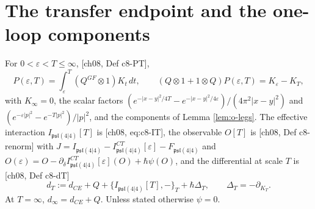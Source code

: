 \section{The transfer endpoint and the one-loop components}

\begin{definition}
\label{def:o-scale}
For $0<\varepsilon<T\le\infty$, [ch08, Def c8-PT],
\begin{equation}
P(\varepsilon,T)=\int_\varepsilon^T(Q^{GF}\otimes1)K_t\,dt,\qquad (Q\otimes1+1\otimes Q)P(\varepsilon,T)=K_\varepsilon-K_T,
\label{eq:o-PT}
\end{equation}
with $K_\infty=0$, the scalar factors $(e^{-|x-y|^2/4T}-e^{-|x-y|^2/4\varepsilon})/(4\pi^2|x-y|^2)$ and $(e^{-\varepsilon|p|^2}-e^{-T|p|^2})/|p|^2$, and the components of Lemma \ref{lem:o-legs}. The effective interaction $I_{\mathfrak{psl}(4|4)}[T]$ is [ch08, eq:c8-IT], the observable $O[T]$ is [ch08, Def c8-renorm] with $J=I_{\mathfrak{psl}(4|4)}-I^{CT}_{\mathfrak{psl}(4|4)}[\varepsilon]-F_{\mathfrak{psl}(4|4)}$ and $O(\varepsilon)=O-\partial_\delta I^{CT}_{\mathfrak{psl}(4|4)}[\varepsilon](O)+\hbar\psi(O)$, and the differential at scale $T$ is [ch08, Def c8-dT]
\begin{equation}
d_T:=d_{CE}+Q+\big\{I_{\mathfrak{psl}(4|4)}[T],-\big\}_T+\hbar\Delta_T,\qquad \Delta_T=-\partial_{K_T}.
\label{eq:o-dT}
\end{equation}
At $T=\infty$, $d_\infty=d_{CE}+Q$. Unless stated otherwise $\psi=0$.
\end{definition}

